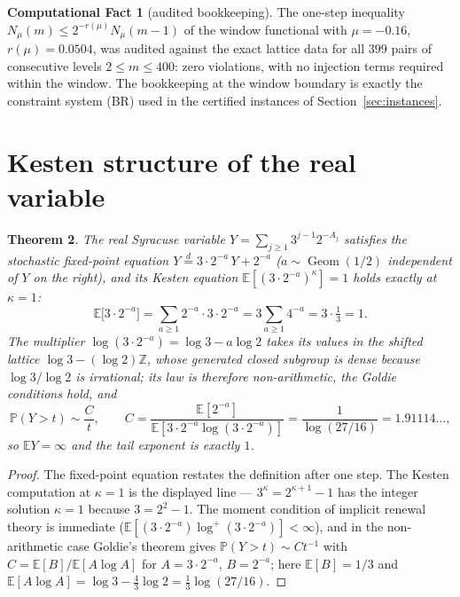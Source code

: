 \documentclass[11pt]{article}
\newtheorem{theorem}{Theorem}[section]
\theoremstyle{definition}
\newtheorem{compfact}[theorem]{Computational Fact}
\DeclareMathOperator{\Geom}{Geom}
\newcommand{\E}{\mathbb{E}}
\newcommand{\Prob}{\mathbb{P}}
\begin{document}
\begin{compfact}[audited bookkeeping]\label{cf:audit}
The one-step inequality $N_{\mu}(m)\le 2^{-r(\mu)}N_{\mu}(m-1)$ of the
window functional with $\mu=-0.16$, $r(\mu)=0.0504$, was audited against
the exact lattice data for all $399$ pairs of consecutive levels
$2\le m\le 400$: zero violations, with no injection terms required within
the window. The bookkeeping at the window boundary is exactly the
constraint system (BR) used in the certified instances of
Section~\ref{sec:instances}.
\end{compfact}

\section{Kesten structure of the real variable}\label{sec:kesten}

\begin{theorem}\label{thm:kesten}
The real Syracuse variable $Y=\sum_{j\ge1}3^{j-1}2^{-A_j}$ satisfies the
stochastic fixed-point equation
$Y\overset{d}{=}3\cdot 2^{-a}\,Y+2^{-a}$ ($a\sim\Geom(1/2)$ independent
of $Y$ on the right), and its Kesten equation
$\E[(3\cdot 2^{-a})^{\kappa}]=1$ holds \emph{exactly} at $\kappa=1$:
\[
\E\bigl[3\cdot 2^{-a}\bigr]
=\sum_{a\ge 1}2^{-a}\cdot 3\cdot 2^{-a}
=3\sum_{a\ge 1}4^{-a}=3\cdot\tfrac13=1 .
\]
The multiplier $\log(3\cdot 2^{-a})=\log 3-a\log 2$ takes its values
in the shifted lattice $\log 3-(\log 2)\mathbb{Z}$, whose generated closed
subgroup is dense because $\log 3/\log 2$ is irrational; its law is
therefore \emph{non-arithmetic}, the Goldie conditions hold, and
\[
\Prob(Y>t)\sim\frac{C}{t},\qquad
C=\frac{\E[2^{-a}]}{\E[3\cdot 2^{-a}\log(3\cdot 2^{-a})]}
=\frac{1}{\log(27/16)}=1.91114\ldots,
\]
so $\E Y=\infty$ and the tail exponent is exactly $1$.
\end{theorem}

\begin{proof}
The fixed-point equation restates the definition after one step. The
Kesten computation at $\kappa=1$ is the displayed line ---
$3^{\kappa}=2^{\kappa+1}-1$ has the integer solution $\kappa=1$ because
$3=2^2-1$. The moment condition of implicit renewal theory
\cite{Kesten1973,Goldie1991} is immediate
($\E[(3\cdot2^{-a})\log^+(3\cdot2^{-a})]<\infty$), and in the
non-arithmetic case Goldie's theorem gives $\Prob(Y>t)\sim Ct^{-1}$ with
$C=\E[B]/\E[A\log A]$ for $A=3\cdot 2^{-a}$, $B=2^{-a}$; here
$\E[B]=1/3$ and $\E[A\log A]=\log 3-\tfrac43\log 2=\tfrac13\log(27/16)$.
\end{proof}
\end{document}
